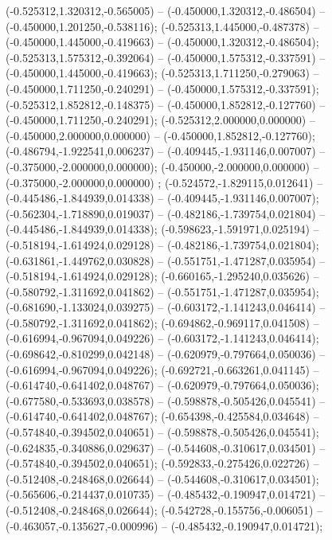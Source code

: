  (-0.525312,1.320312,-0.565005) -- (-0.450000,1.320312,-0.486504) -- (-0.450000,1.201250,-0.538116);
 (-0.525313,1.445000,-0.487378) -- (-0.450000,1.445000,-0.419663) -- (-0.450000,1.320312,-0.486504);
 (-0.525313,1.575312,-0.392064) -- (-0.450000,1.575312,-0.337591) -- (-0.450000,1.445000,-0.419663);
 (-0.525313,1.711250,-0.279063) -- (-0.450000,1.711250,-0.240291) -- (-0.450000,1.575312,-0.337591);
 (-0.525312,1.852812,-0.148375) -- (-0.450000,1.852812,-0.127760) -- (-0.450000,1.711250,-0.240291);
 (-0.525312,2.000000,0.000000) -- (-0.450000,2.000000,0.000000) -- (-0.450000,1.852812,-0.127760);
 (-0.486794,-1.922541,0.006237) -- (-0.409445,-1.931146,0.007007) -- (-0.375000,-2.000000,0.000000);
 (-0.450000,-2.000000,0.000000) -- (-0.375000,-2.000000,0.000000) ;
 (-0.524572,-1.829115,0.012641) -- (-0.445486,-1.844939,0.014338) -- (-0.409445,-1.931146,0.007007);
 (-0.562304,-1.718890,0.019037) -- (-0.482186,-1.739754,0.021804) -- (-0.445486,-1.844939,0.014338);
 (-0.598623,-1.591971,0.025194) -- (-0.518194,-1.614924,0.029128) -- (-0.482186,-1.739754,0.021804);
 (-0.631861,-1.449762,0.030828) -- (-0.551751,-1.471287,0.035954) -- (-0.518194,-1.614924,0.029128);
 (-0.660165,-1.295240,0.035626) -- (-0.580792,-1.311692,0.041862) -- (-0.551751,-1.471287,0.035954);
 (-0.681690,-1.133024,0.039275) -- (-0.603172,-1.141243,0.046414) -- (-0.580792,-1.311692,0.041862);
 (-0.694862,-0.969117,0.041508) -- (-0.616994,-0.967094,0.049226) -- (-0.603172,-1.141243,0.046414);
 (-0.698642,-0.810299,0.042148) -- (-0.620979,-0.797664,0.050036) -- (-0.616994,-0.967094,0.049226);
 (-0.692721,-0.663261,0.041145) -- (-0.614740,-0.641402,0.048767) -- (-0.620979,-0.797664,0.050036);
 (-0.677580,-0.533693,0.038578) -- (-0.598878,-0.505426,0.045541) -- (-0.614740,-0.641402,0.048767);
 (-0.654398,-0.425584,0.034648) -- (-0.574840,-0.394502,0.040651) -- (-0.598878,-0.505426,0.045541);
 (-0.624835,-0.340886,0.029637) -- (-0.544608,-0.310617,0.034501) -- (-0.574840,-0.394502,0.040651);
 (-0.592833,-0.275426,0.022726) -- (-0.512408,-0.248468,0.026644) -- (-0.544608,-0.310617,0.034501);
 (-0.565606,-0.214437,0.010735) -- (-0.485432,-0.190947,0.014721) -- (-0.512408,-0.248468,0.026644);
 (-0.542728,-0.155756,-0.006051) -- (-0.463057,-0.135627,-0.000996) -- (-0.485432,-0.190947,0.014721);

